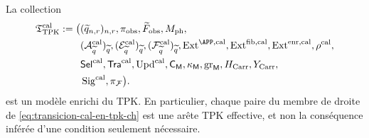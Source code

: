 \begin{proposition}
\label{prop:modelo-tpk-calibrado-ch}
La collection
\[
\begin{aligned}
 \mathfrak T_{\rm TPK}^{\rm cal}:=\bigl(
 &(\widetilde q_{n,r})_{n,r},\pi_{\rm obs},
   \widetilde F_{\rm obs},M_{\rm ph},\\
 &(\mathcal A_{\widetilde q}^{\rm cal})_{\widetilde q},
   (\mathcal E_{\widetilde q}^{\rm cal})_{\widetilde q},
   (\mathcal F_{\widetilde q}^{\rm cal})_{\widetilde q},
   \operatorname{Ext}^{\APP,\rm cal},
   \operatorname{Ext}^{\rm fib,cal},
   \operatorname{Ext}^{\rm enr,cal},\rho^{\rm cal},\\
 &\mathsf{Sel}^{\rm cal},\mathsf{Tra}^{\rm cal},
   \operatorname{Upd}^{\rm cal},\mathsf C_{\mathsf M},
   \kappa_{\mathsf M},\operatorname{gr}_{\mathsf M},
   H_{\rm Carr},Y_{\rm Carr},\\
 &\operatorname{Sig}^{\rm cal},\pi_{\mathcal F}\bigr).
\end{aligned}
\]
est un modèle enrichi du TPK. En particulier, chaque paire du membre de droite de \eqref{eq:transicion-cal-en-tpk-ch} est une arête TPK effective, et non la conséquence inférée d'une condition seulement nécessaire.
\end{proposition}

